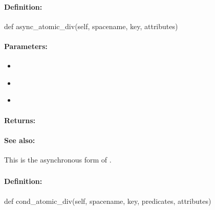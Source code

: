 \paragraph{Definition:}
\begin{pythoncode}
def async_atomic_div(self, spacename, key, attributes)
\end{pythoncode}

\paragraph{Parameters:}
\begin{itemize}[noitemsep]
\item {}\\

\item {}\\

\item {}\\

\end{itemize}

\paragraph{Returns:}


\paragraph{See also:}  This is the asynchronous form of .

\pagebreak
\subsubsection{}
\label{api:python:cond_atomic_div}


\paragraph{Definition:}
\begin{pythoncode}
def cond_atomic_div(self, spacename, key, predicates, attributes)
\end{pythoncode}

